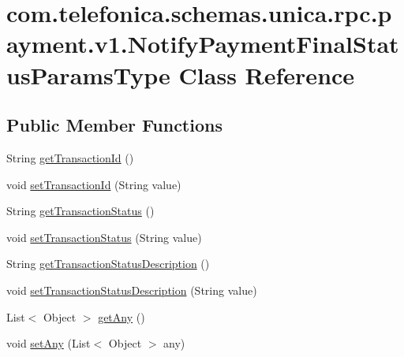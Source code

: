 \hypertarget{classcom_1_1telefonica_1_1schemas_1_1unica_1_1rpc_1_1payment_1_1v1_1_1NotifyPaymentFinalStatusParamsType}{
\section{com.telefonica.schemas.unica.rpc.payment.v1.NotifyPaymentFinalStatusParamsType Class Reference}
\label{classcom_1_1telefonica_1_1schemas_1_1unica_1_1rpc_1_1payment_1_1v1_1_1NotifyPaymentFinalStatusParamsType}
}
\subsection*{Public Member Functions}
\begin{DoxyCompactItemize}
\item 
String \hyperlink{classcom_1_1telefonica_1_1schemas_1_1unica_1_1rpc_1_1payment_1_1v1_1_1NotifyPaymentFinalStatusParamsType_a0b189189c4e10d25affeb7c1fffdad89}{getTransactionId} ()
\item 
void \hyperlink{classcom_1_1telefonica_1_1schemas_1_1unica_1_1rpc_1_1payment_1_1v1_1_1NotifyPaymentFinalStatusParamsType_a0c3cc61b77fc27eef3d0441cfd5d4720}{setTransactionId} (String value)
\item 
String \hyperlink{classcom_1_1telefonica_1_1schemas_1_1unica_1_1rpc_1_1payment_1_1v1_1_1NotifyPaymentFinalStatusParamsType_aa5103cc2bbdc3d1f6f9e3080b5ca3666}{getTransactionStatus} ()
\item 
void \hyperlink{classcom_1_1telefonica_1_1schemas_1_1unica_1_1rpc_1_1payment_1_1v1_1_1NotifyPaymentFinalStatusParamsType_a40d8f0cb87dc61c19494d4d639966313}{setTransactionStatus} (String value)
\item 
String \hyperlink{classcom_1_1telefonica_1_1schemas_1_1unica_1_1rpc_1_1payment_1_1v1_1_1NotifyPaymentFinalStatusParamsType_ae49fd8b46704c3250fb645b54544c029}{getTransactionStatusDescription} ()
\item 
void \hyperlink{classcom_1_1telefonica_1_1schemas_1_1unica_1_1rpc_1_1payment_1_1v1_1_1NotifyPaymentFinalStatusParamsType_ad84512c02da7d2a2e09aed035b8b8114}{setTransactionStatusDescription} (String value)
\item 
List$<$ Object $>$ \hyperlink{classcom_1_1telefonica_1_1schemas_1_1unica_1_1rpc_1_1payment_1_1v1_1_1NotifyPaymentFinalStatusParamsType_a9d6c0050b1abd06c1b8533c0b531ac60}{getAny} ()
\item 
void \hyperlink{classcom_1_1telefonica_1_1schemas_1_1unica_1_1rpc_1_1payment_1_1v1_1_1NotifyPaymentFinalStatusParamsType_ae5038ef3f8bc5d871a1ff5e19be5bcf5}{setAny} (List$<$ Object $>$ any)
\end{DoxyCompactItemize}
